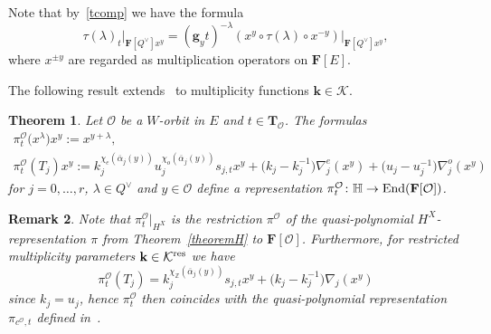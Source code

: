 \documentclass[11pt]{article}
\numberwithin{equation}{section}
\numberwithin{equation}{section}
\newtheorem{Theorem}{Theorem}[section]
\newtheorem{Remark}[Theorem]{Remark} }
\begin{document}
Note that by~\eqref{tcomp} we have the formula
\[
\tau(\lambda)_t\vert_{\mathbf{F}[Q^\vee]x^y}=(\mathbf{g}_yt)^{-\lambda}(x^y\circ\tau(\lambda)\circ x^{-y})\vert_{\mathbf{F}[Q^\vee]x^y},
\]
where $x^{\pm y}$ are regarded as multiplication operators on $\mathbf{F}[E]$.

The following result extends~\cite[Theorem~1.1]{SSV2} to multiplicity functions $\mathbf{k}\in\mathcal{K}$.
\begin{Theorem}\label{mthm}
Let $\mathcal{O}$ be a $W$-orbit in $E$ and $t\in\mathbf{T}_\mathcal{O}$. The formulas
\begin{gather}
\pi_{t}^\mathcal{O}\bigl(x^\lambda\bigr)x^y:=x^{y+\lambda}, \nonumber\\
\pi_{t}^\mathcal{O}(T_j)x^y:=k_j^{\chi_e(\overline{\alpha}_j(y))}u_j^{\chi_o(\overline{\alpha}_j(y))}s_{j,t}x^y+\bigl(k_j-k_j^{-1}\bigr)\nabla_j^e(x^y)+
\bigl(u_j-u_j^{-1}\bigr)\nabla_j^o(x^y)
\label{qprepHH}
\end{gather}
for $j=0,\dots,r$, $\lambda\in Q^\vee$ and $y\in\mathcal{O}$ define a representation $\pi_{t}^\mathcal{O}\colon \mathbb{H}\rightarrow\textup{End}(\mathbf{F}[\mathcal{O}])$.
\end{Theorem}
\begin{Remark}
Note that $\pi_{t}^\mathcal{O}\vert_{H^X}$ is the restriction $\pi^{\mathcal{O}}$ of the quasi-polynomial $H^X$-represen\-tation $\pi$ from Theorem~\ref{theoremH} to $\mathbf{F}[\mathcal{O}]$. Furthermore, for restricted multiplicity
parameters $\mathbf{k}\in\mathcal{K}^{{\rm res}}$ we have
\[
\pi_{t}^\mathcal{O}(T_j)=k_j^{\chi_{\mathbb{Z}}(\overline{\alpha}_j(y))}s_{j,t}x^y+\bigl(k_j-k_j^{-1}\bigr)\nabla_j(x^y)
\]
since $k_j=u_j$, hence $\pi_{t}^\mathcal{O}$ then coincides with the quasi-polynomial representation $\pi_{c^\mathcal{O},t}$ defined in~\cite[Theorem~1.1]{SSV2}.
\end{Remark}
\end{document}
